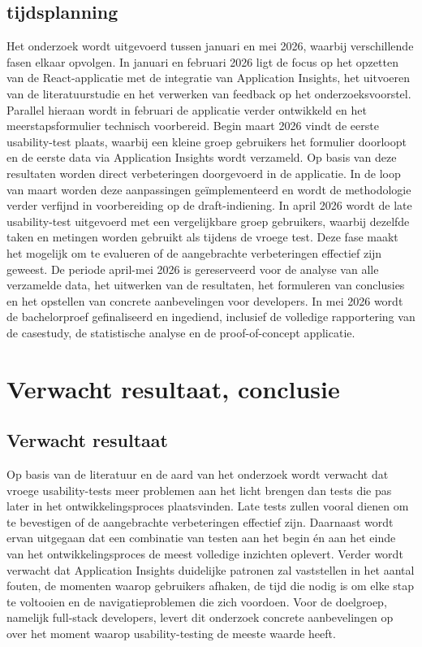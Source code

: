 \subsection{tijdsplanning}
Het onderzoek wordt uitgevoerd tussen januari en mei 2026, waarbij verschillende fasen elkaar opvolgen. In januari en februari 2026 ligt de focus op het opzetten van de React-applicatie met de integratie van Application Insights, het uitvoeren van de literatuurstudie en het verwerken van feedback op het onderzoeksvoorstel. Parallel hieraan wordt in februari de applicatie verder ontwikkeld en het meerstapsformulier technisch voorbereid.
Begin maart 2026 vindt de eerste usability-test plaats, waarbij een kleine groep gebruikers het formulier doorloopt en de eerste data via Application Insights wordt verzameld. Op basis van deze resultaten worden direct verbeteringen doorgevoerd in de applicatie. In de loop van maart worden deze aanpassingen geïmplementeerd en wordt de methodologie verder verfijnd in voorbereiding op de draft-indiening.
In april 2026 wordt de late usability-test uitgevoerd met een vergelijkbare groep gebruikers, waarbij dezelfde taken en metingen worden gebruikt als tijdens de vroege test. Deze fase maakt het mogelijk om te evalueren of de aangebrachte verbeteringen effectief zijn geweest. De periode april-mei 2026 is gereserveerd voor de analyse van alle verzamelde data, het uitwerken van de resultaten, het formuleren van conclusies en het opstellen van concrete aanbevelingen voor developers.
In mei 2026 wordt de bachelorproef gefinaliseerd en ingediend, inclusief de volledige rapportering van de casestudy, de statistische analyse en de proof-of-concept applicatie.
\section{Verwacht resultaat, conclusie}%
\label{sec:verwachte_resultaten}
\subsection{Verwacht resultaat}
Op basis van de literatuur en de aard van het onderzoek wordt verwacht dat vroege usability-tests meer problemen aan het licht brengen dan tests die pas later in het ontwikkelingsproces plaatsvinden. 
Late tests zullen vooral dienen om te bevestigen of de aangebrachte verbeteringen effectief zijn. 
Daarnaast wordt ervan uitgegaan dat een combinatie van testen aan het begin én aan het einde van het ontwikkelingsproces de meest volledige inzichten oplevert. 
Verder wordt verwacht dat Application Insights duidelijke patronen zal vaststellen in het aantal fouten, de momenten waarop gebruikers afhaken, de tijd die nodig is om elke stap te voltooien en de navigatieproblemen die zich voordoen. 
Voor de doelgroep, namelijk full-stack developers, levert dit onderzoek concrete aanbevelingen op over het moment waarop usability-testing de meeste waarde heeft.

